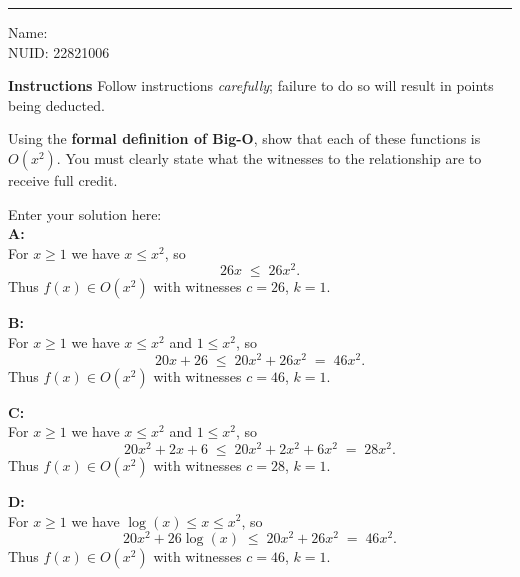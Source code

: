 \documentclass[10pt]{exam}
\begin{document}
\hrule

\vspace{.50cm} Name:
\\ NUID: 22821006
\vspace{.50cm}

\textbf{Instructions} Follow instructions \emph{carefully}; failure to do so will result in points being deducted. 

\begin{questions}

\question[16] Using the \textbf{formal definition of Big-O}, show that each of these functions is $O(x^2)$. You must clearly state what the witnesses to the relationship are to receive full credit.

\begin{solution}
    Enter your solution here:\\
    \textbf{A:}\\
    For $x \ge 1$ we have $x \le x^2$, so
    \[26x \;\le\; 26x^2.\]
    Thus $f(x) \in O(x^2)$ with witnesses $c = 26$, $k = 1$.
 
    \textbf{B:}\\
    For $x \ge 1$ we have $x \le x^2$ and $1 \le x^2$, so
    \[20x + 26 \;\le\; 20x^2 + 26x^2 \;=\; 46x^2.\]
    Thus $f(x) \in O(x^2)$ with witnesses $c = 46$, $k = 1$.
 
    \textbf{C:}\\
    For $x \ge 1$ we have $x \le x^2$ and $1 \le x^2$, so
    \[20x^2 + 2x + 6\;\le\; 20x^2 + 2x^2 + 6x^2\;=\; 28x^2.\]
    Thus $f(x) \in O(x^2)$ with witnesses $c = 28$, $k = 1$.
 
    \textbf{D:}\\
    For $x \ge 1$ we have $\log(x) \le x \le x^2$, so
        \[20x^2 + 26\log(x)\;\le\; 20x^2 + 26x^2\;=\; 46x^2.\]
    Thus $f(x) \in O(x^2)$ with witnesses $c = 46$, $k = 1$.
\end{solution}


\end{questions}
\end{document}
